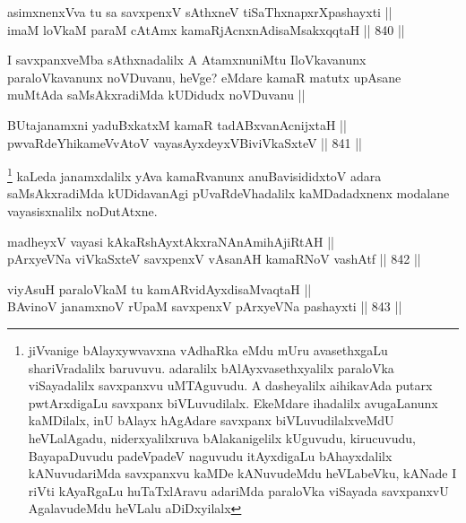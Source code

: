 \begin{shl}
asimxnenxVva tu sa savxpenxV sAthxneV tiSaThxnapxrXpashayxti ||  \\
imaM loVkaM paraM cA\s \s tAmx kamaRjAcnxnAdisaMsakxqqtaH ||  840 ||  
\end{shl}

\begin{artha}
I savxpanxveMba sAthxnadalilx A AtamxnuniMtu IloVkavanunx paraloVkavanunx noVDuvanu, heVge? eMdare kamaR matutx upAsane muMtAda saMsAkxradiMda kUDidudx noVDuvanu ||
\end{artha}


\begin{shl}
BUtajanamxni yaduBxkatxM kamaR tadABxvanAcnijxtaH || \\
pwvaRdeYhikameVvAtoV vayasAyxdeyxV\s BiviVkaSxteV ||  841 ||  
\end{shl}

\begin{artha}
\footnote{jiVvanige bAlayxywvavxna vAdhaRka eMdu mUru avasethxgaLu shariVradalilx baruvuvu. adaralilx bAlAyxvasethxyalilx paraloVka viSayadalilx savxpanxvu uMTAguvudu. A dasheyalilx aihikavAda putarx pwtArxdigaLu savxpanx biVLuvudilalx. EkeMdare ihadalilx avugaLanunx kaMDilalx, inU bAlayx hAgAdare savxpanx biVLuvudilalxveMdU heVLalAgadu, niderxyalilxruva bAlakanigelilx kUguvudu, kirucuvudu, BayapaDuvudu padeVpadeV naguvudu itAyxdigaLu bAhayxdalilx kANuvudariMda savxpanxvu kaMDe kANuvudeMdu heVLabeVku, kANade I riVti kAyaRgaLu huTaTxlAravu adariMda paraloVka viSayada savxpanxvU AgalavudeMdu heVLalu aDiDxyilalx}
kaLeda janamxdalilx yAva kamaRvanunx anuBavisididxtoV adara saMsAkxradiMda kUDidavanAgi pUvaRdeVhadalilx kaMDadadxnenx modalane vayasisxnalilx noDutAtxne.
\end{artha}

\begin{shl}
madheyxV vayasi kAkaRshAyxtAkxraNAnAmihA\s \s jiRtAH || \\
pArxyeVNa viVkaSxteV savxpenxV vAsanAH kamaRNoV vashAtf ||  842 ||  
\end{shl}
				
\begin{shl}
viyAsuH paraloVkaM tu kamARvidAyxdisaMvaqtaH || \\
BAvinoV janamxnoV rUpaM savxpenxV pArxyeVNa pashayxti ||  843 ||  
\end{shl}

